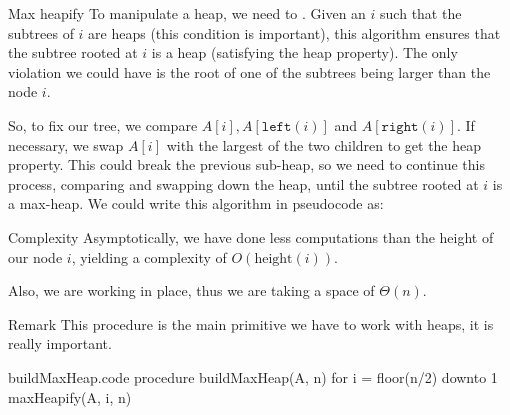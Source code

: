 \documentclass[a4paper]{article}
\begin{document}
\begin{parag}{Max heapify}
    To manipulate a heap, we need to . Given an $i$ such that the subtrees of $i$ are heaps (this condition is important), this algorithm ensures that the subtree rooted at $i$ is a heap (satisfying the heap property). The only violation we could have is the root of one of the subtrees being larger than the node $i$.

    So, to fix our tree, we compare $A\left[i\right], A\left[\texttt{left}\left(i\right)\right]$ and $A\left[\texttt{right}\left(i\right)\right]$. If necessary, we swap $A\left[i\right]$ with the largest of the two children to get the heap property. This could break the previous sub-heap, so we need to continue this process, comparing and swapping down the heap, until the subtree rooted at $i$ is a max-heap. We could write this algorithm in pseudocode as:

    \begin{subparag}{Complexity}
        Asymptotically, we have done less computations than the height of our node $i$, yielding a complexity of $O\left(\text{height}\left(i\right)\right)$.

        Also, we are working in place, thus we are taking a space of $\Theta\left(n\right)$.
    \end{subparag}
    
    \begin{subparag}{Remark}
        This procedure is the main primitive we have to work with heaps, it is really important.
    \end{subparag}
\end{parag}

\begin{filecontents*}[overwrite]{buildMaxHeap.code}
procedure buildMaxHeap(A, n)
    for i = floor(n/2) downto 1
        maxHeapify(A, i, n)
\end{filecontents*}
\end{document}
